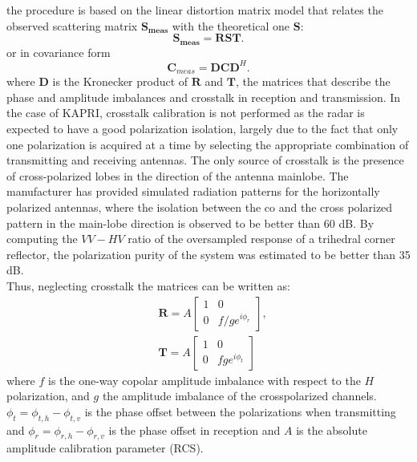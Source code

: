 the procedure is based on the linear distortion matrix model\cite{Saraband1990, Sarabandi1992a} that relates the observed scattering matrix $\mathbf{S_{meas}}$ with the theoretical one $\mathbf{S}$:
\begin{equation}\label{eq:distorsion_scattering}
	\mathbf{S_{meas}} = \mathbf{R} \mathbf{S} \mathbf{T}.
\end{equation}
or in covariance form
\begin{equation}\label{eq:covariance_distortion}
	\mathbf{C}_{meas} = \mathbf{D} \mathbf{C} \mathbf{D}^{H}.
\end{equation}
where $\mathbf{D}$ is the Kronecker product of $\mathbf{R}$ and $\mathbf{T}$, the matrices that describe the phase and amplitude imbalances and crosstalk in reception and transmission.
In the case of KAPRI, crosstalk calibration is not performed as the radar is expected to have a good polarization isolation, largely due to the fact that only one polarization is acquired at a time by selecting the appropriate combination of transmitting and receiving antennas. The only source of crosstalk is the presence of cross-polarized lobes in the direction of the antenna mainlobe. The manufacturer has provided simulated radiation patterns for the horizontally polarized antennas, where the isolation between the co and the cross polarized pattern in the main-lobe direction is observed to be better than 60 dB. By computing the $VV-HV$ ratio of the oversampled response of a trihedral corner reflector, the polarization purity of the system was estimated to be better than 35 dB.\\
Thus, neglecting crosstalk the matrices can be written as:
\begin{equation}
	\begin{aligned}
	&\mathbf{R} = A \begin{bmatrix}
		1 & 0\\
		0 & f/g e^{i\phi_{r}}
	\end{bmatrix},\\
	&\mathbf{T} = A \begin{bmatrix}
			1 & 0\\
			0 & f g e^{i\phi_{t}}
		\end{bmatrix}
	\end{aligned}
\end{equation}
where $f$ is the one-way copolar amplitude imbalance with respect to the $H$ polarization, and $g$ the amplitude imbalance of the crosspolarized channels. $\phi_t = \phi_{t,h} -\phi_{t,v}$ is the phase offset between the polarizations when transmitting and $\phi_{r} = \phi_{r,h} -\phi_{r,v}$ is the phase offset in reception and $A$ is the absolute amplitude calibration parameter (RCS)\cite{Ainsworth2006a, Fore2015}.\\
